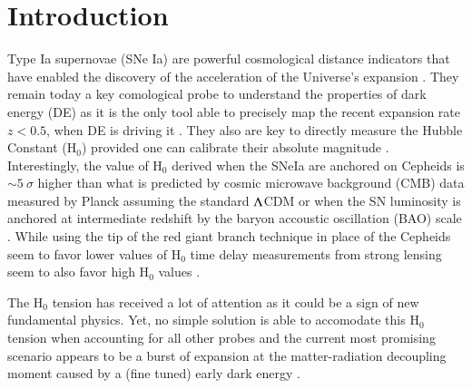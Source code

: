 \documentclass[]{aa} %
\begin{document}
\section{Introduction}




Type Ia supernovae (SNe Ia) are powerful cosmological distance indicators that
have enabled the discovery of the acceleration of the Universe's expansion
\citep{riess1998, permutter1999}. They remain today a key comological probe to
understand the properties of dark energy (DE) as it is the only tool able to
precisely map the recent expansion rate $z<0.5$, when DE is driving it
\citep[e.g.][]{scolnicastro2020}. They also are key to directly measure the
Hubble Constant (H$_0$) provided one can calibrate their absolute magnitude
\citep{riess2016, freedman2019}. Interestingly, the value of H$_0$ derived when
the SNeIa are anchored on Cepheids \citep[the SH0ES
project][]{riess2009,riess2016} is $\sim5~\sigma$ higher than what is predicted
by cosmic microwave background (CMB) data measured by Planck assuming the
standard $\Lambda$CDM or when the SN luminosity is anchored at intermediate redshift
by the baryon accoustic oscillation (BAO) scale \citep{riess2019, ried2019,
planck, feeney}. While using the tip of the red giant branch technique in place
of the Cepheids seem to favor lower values of H$_0$ \citep{freedman,
recalibrationpaper} time delay measurements from strong lensing seem to also
favor high H$_0$ values \citep{wong2019}.

The H$_0$ tension has received a lot of attention as it could be a sign of new
fundamental physics. Yet, no simple solution is able to accomodate this H$_0$
tension when accounting for all other probes and the current most promising
scenario appears to be a burst of expansion at the matter-radiation decoupling
moment caused by a (fine tuned) early dark energy \citep{poulin}.
\end{document}
